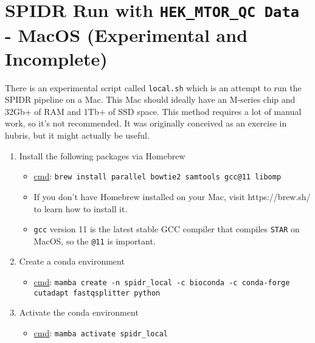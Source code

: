 \documentclass{article}
\begin{document}
    \noindent\makebox[\linewidth]{\rule{\paperwidth}{0.4pt}}

    \section{SPIDR Run with \texttt{HEK\_MTOR\_QC Data} - MacOS (Experimental and Incomplete)}

    There is an experimental script called \texttt{local.sh} which is an attempt to run the SPIDR pipeline on a Mac. This Mac should ideally have an M-series chip and 32Gb+ of RAM and 1Tb+ of SSD space. This method requires a lot of manual work, so it's not recommended. It was originally conceived as an exercise in hubris, but it might actually be useful.

    \begin{enumerate}
        \item Install the following packages via Homebrew
        \begin{itemize}
            \item \underline{cmd}: \texttt{brew install parallel bowtie2 samtools gcc@11 libomp}
            \item If you don't have Homebrew installed on your Mac, visit https://brew.sh/ to learn how to install it.
            \item \texttt{gcc} version 11 is the latest stable GCC compiler that compiles \texttt{STAR} on MacOS, so the \texttt{@11} is important.
        \end{itemize}

        \item Create a conda environment
        \begin{itemize}
            \item \underline{cmd}: \texttt{mamba create -n spidr\_local -c bioconda -c conda-forge cutadapt fastqsplitter python}
        \end{itemize}

        \item Activate the conda environment
        \begin{itemize}
            \item \underline{cmd}: \texttt{mamba activate spidr\_local}
        \end{itemize}


\end{enumerate}
\end{document}
